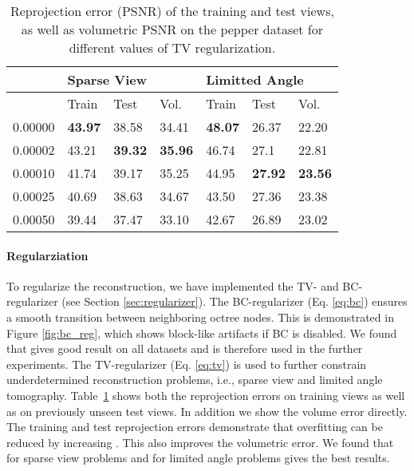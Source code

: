 \documentclass[acmtog,nonacm]{acmart} \acmSubmissionID{0438}
\begin{document}
\begin{table}[]
\begin{tabular}{@{}l|lll|lll@{}}
\toprule
        & \multicolumn{3}{l|}{Sparse View} & \multicolumn{3}{l}{Limitted Angle} \\ \midrule
        & Train           & Test            &       Vol.    & Train             & Test         &       Vol.        \\ \midrule
0.00000 & \textbf{43.97}  & 38.58     &  34.41   & \textbf{48.07}   & 26.37 & 22.20          \\
0.00002 & 43.21           & \textbf{39.32}  &  \textbf{35.96}  & 46.74            & 27.1 &22.81           \\
0.00010 & 41.74           & 39.17     &   35.25  & 44.95            & \textbf{27.92} & \textbf{23.56} \\
0.00025 & 40.69           & 38.63     &   34.67  & 43.50            & 27.36      & 23.38     \\
0.00050 & 39.44           & 37.47     &   33.10  & 42.67            & 26.89        & 23.02   \\ \bottomrule
\end{tabular}
\caption{ Reprojection error (PSNR) of the training and test views, as
  well as volumetric PSNR on the pepper dataset for different values of
  TV regularization.}
\label{tab:tvreg}
\end{table}

\paragraph{Regularziation} 
To regularize the reconstruction, we have implemented the TV- and BC-regularizer (see Section \ref{sec:regularizer}).
The BC-regularizer (Eq. \ref{eq:bc}) ensures a smooth transition between neighboring octree nodes. 
This is demonstrated in Figure \ref{fig:bc_reg}, which shows block-like artifacts if BC is disabled.
We found that  gives good result on all datasets and is therefore used in the further experiments.
The TV-regularizer (Eq. \ref{eq:tv}) is used to further constrain underdetermined reconstruction problems, i.e., sparse view and limited angle tomography.
Table~\ref{tab:tvreg} shows both the reprojection errors on training views as
well as on previously unseen test views. In addition we show the
volume error directly.
The training and test reprojection errors demonstrate that overfitting can be reduced by increasing  .
This also improves the  volumetric error.
We found that for sparse view problems  and for limited angle problems   gives the best results.
\end{document}

